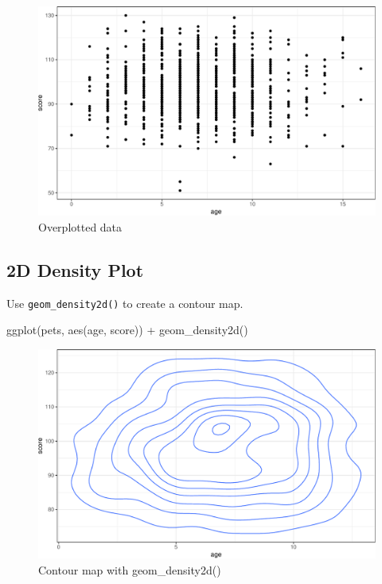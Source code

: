 \documentclass[
  oneside]{book}
\newenvironment{Shaded}{\begin{snugshade}}{\end{snugshade}}
\newcommand{\FunctionTok}[1]{\textcolor[rgb]{0.00,0.00,0.00}{#1}}
\newcommand{\NormalTok}[1]{#1}
\newcommand{\SpecialCharTok}[1]{\textcolor[rgb]{0.00,0.00,0.00}{#1}}
\begin{document}
\begin{figure}

{\centering \includegraphics[width=0.9\linewidth]{images/overplot-point-1} 

}

\caption{Overplotted data}\label{fig:overplot-point}
\end{figure}

\hypertarget{geom_density2d}{%
\subsection{2D Density Plot}\label{geom_density2d}}

Use \texttt{geom\_density2d()} to create a contour map.

\begin{Shaded}
\begin{Highlighting}[]
\FunctionTok{ggplot}\NormalTok{(pets, }\FunctionTok{aes}\NormalTok{(age, score)) }\SpecialCharTok{+}
  \FunctionTok{geom\_density2d}\NormalTok{()}
\end{Highlighting}
\end{Shaded}

\begin{figure}

{\centering \includegraphics[width=0.9\linewidth]{images/density2d-1} 

}

\caption{Contour map with geom_density2d()}\label{fig:density2d}
\end{figure}
\end{document}
